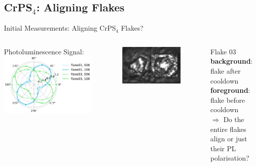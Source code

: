 \documentclass[
	10pt,
]{beamer}
\begin{document}
\subsection{CrPS$_4$: Aligning Flakes}
\begin{frame}{Initial Measurements: Aligning CrPS$_4$ Flakes?}
	\begin{columns}
		Photoluminescence Signal:
		{\centering
		\includegraphics[width=\textwidth]{../figures/2023-12-14 flake turning linear polarisation.pdf}}

		\begin{figure}
			\centering
			\includegraphics[width=\textwidth]{../../data/2023-12-14_CrPS4_outPlane/flake03_rotation_cropped.png}
		\end{figure}
		Flake 03\\ \textbf{background}: flake after cooldown\\ \textbf{foreground}: flake before cooldown\\
		\vspace{.5cm}
		{\color{seeblau}$\Rightarrow$} Do the entire flakes align or just their PL polarisation?
	\end{columns}
\end{frame}
\end{document}

